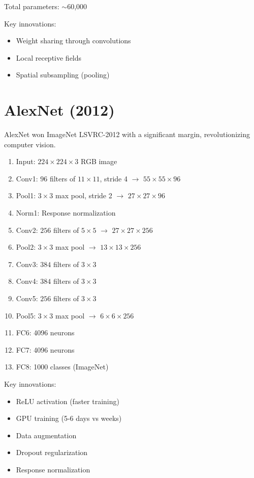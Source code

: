 Total parameters: $\sim$60,000

Key innovations:
\begin{itemize}
    \item Weight sharing through convolutions
    \item Local receptive fields
    \item Spatial subsampling (pooling)
\end{itemize}

\section{AlexNet (2012)}

AlexNet won ImageNet LSVRC-2012 with a significant margin, revolutionizing computer vision.

\begin{architecture}
\begin{enumerate}
    \item Input: $224\times224\times3$ RGB image
    \item Conv1: $96$ filters of $11\times11$, stride 4 $\rightarrow$ $55\times55\times96$
    \item Pool1: $3\times3$ max pool, stride 2 $\rightarrow$ $27\times27\times96$
    \item Norm1: Response normalization
    \item Conv2: $256$ filters of $5\times5$ $\rightarrow$ $27\times27\times256$
    \item Pool2: $3\times3$ max pool $\rightarrow$ $13\times13\times256$
    \item Conv3: $384$ filters of $3\times3$
    \item Conv4: $384$ filters of $3\times3$
    \item Conv5: $256$ filters of $3\times3$
    \item Pool5: $3\times3$ max pool $\rightarrow$ $6\times6\times256$
    \item FC6: 4096 neurons
    \item FC7: 4096 neurons
    \item FC8: 1000 classes (ImageNet)
\end{enumerate}
\end{architecture}

Key innovations:
\begin{itemize}
    \item ReLU activation (faster training)
    \item GPU training (5-6 days vs weeks)
    \item Data augmentation
    \item Dropout regularization
    \item Response normalization
\end{itemize}

